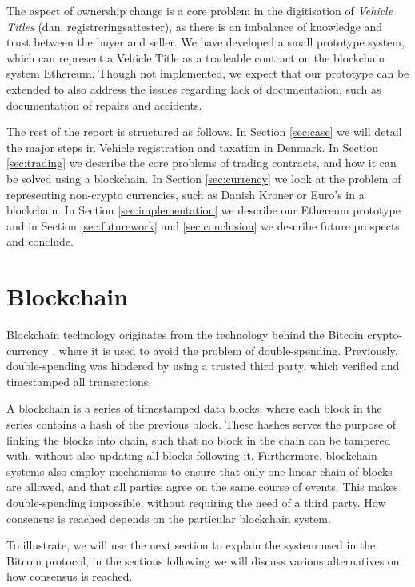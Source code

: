 \documentclass[oneside,a4paper,10pts,article]{memoir}
\begin{document}
The aspect of ownership change is a core problem in the digitisation
of \textit{Vehicle Titles} (dan. registreringsattester), as there is
an imbalance of knowledge and trust between the buyer and seller. We
have developed a small prototype system, which can represent a Vehicle
Title as a tradeable contract on the blockchain system
Ethereum. Though not implemented, we expect that our prototype can be
extended to also address the issues regarding lack of documentation,
such as documentation of repairs and accidents.

The rest of the report is structured as follows. In Section
\ref{sec:case} we will detail the major steps in Vehicle registration
and taxation in Denmark. In Section \ref{sec:trading} we describe the
core problems of trading contracts, and how it can be solved using a
blockchain. In Section \ref{sec:currency} we look at the problem of
representing non-crypto currencies, such as Danish Kroner or Euro's in
a blockchain. In Section \ref{sec:implementation} we describe our
Ethereum prototype and in Section \ref{sec:futurework} and
\ref{sec:conclusion} we describe future prospects and conclude.


\chapter{Blockchain}
\label{sec:blockchain}
Blockchain technology originates from the technology behind the
Bitcoin crypto-currency \cite{bitcoin}, where it is used to avoid the
problem of double-spending. Previously, double-spending was hindered
by using a trusted third party, which verified and timestamped all
transactions.

A blockchain is a series of timestamped data blocks, where each block
in the series contains a hash of the previous block. These hashes
serves the purpose of linking the blocks into chain, such that no
block in the chain can be tampered with, without also updating all
blocks following it. Furthermore, blockchain systems also employ
mechanisms to ensure that only one linear chain of blocks are allowed,
and that all parties agree on the same course of events. This makes
double-spending impossible, without requiring the need of a third
party. How consensus is reached depends on the particular blockchain
system.

To illustrate, we will use the next section to explain the system used
in the Bitcoin protocol, in the sections following we will discuss
various alternatives on how consensus is reached.
\end{document}
